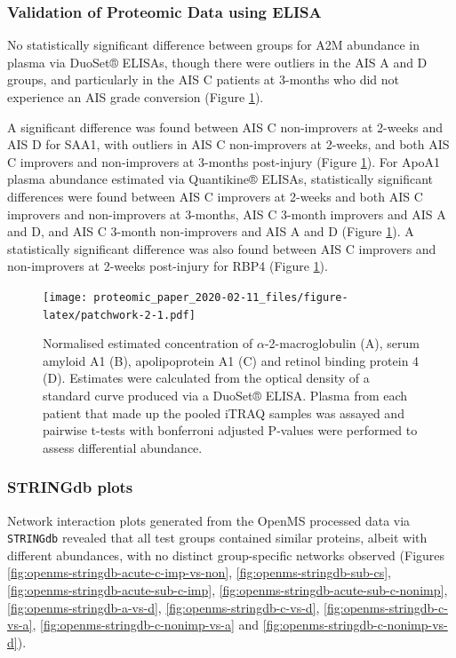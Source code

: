 \documentclass[9pt,lineno]{elife}
\begin{document}
\hypertarget{validation-of-proteomic-data-using-elisa}{%
\subsubsection{Validation of Proteomic Data using ELISA}\label{validation-of-proteomic-data-using-elisa}}

No statistically significant difference between groups for A2M abundance in plasma via DuoSet® ELISAs, though there were outliers in the AIS A and D groups, and particularly in the AIS C patients at 3-months who did not experience an AIS grade conversion (Figure \ref{fig:patchwork-2}).

A significant difference was found between AIS C non-improvers at 2-weeks and AIS D for SAA1, with outliers in AIS C non-improvers at 2-weeks, and both AIS C improvers and non-improvers at 3-months post-injury (Figure \ref{fig:patchwork-2}).
For ApoA1 plasma abundance estimated via Quantikine® ELISAs, statistically significant differences were found between AIS C improvers at 2-weeks and both AIS C improvers and non-improvers at 3-months, AIS C 3-month improvers and AIS A and D, and AIS C 3-month non-improvers and AIS A and D (Figure \ref{fig:patchwork-2}).
A statistically significant difference was also found between AIS C improvers and non-improvers at 2-weeks post-injury for RBP4 (Figure \ref{fig:patchwork-2}).



\begin{figure}
\centering
\texttt{[image: proteomic\_paper\_2020-02-11\_files/figure-latex/patchwork-2-1.pdf]}
\caption{\label{fig:patchwork-2}Normalised estimated concentration of \(\alpha\)-2-macroglobulin (A), serum amyloid A1 (B), apolipoprotein A1 (C) and retinol binding protein 4 (D). Estimates were calculated from the optical density of a standard curve produced via a DuoSet® ELISA. Plasma from each patient that made up the pooled iTRAQ samples was assayed and pairwise t-tests with bonferroni adjusted P-values were performed to assess differential abundance.}
\end{figure}

\hypertarget{stringdb-plots}{%
\subsubsection{STRINGdb plots}\label{stringdb-plots}}

Network interaction plots generated from the OpenMS processed data via \texttt{STRINGdb} revealed that all test groups contained similar proteins, albeit with different abundances, with no distinct group-specific networks observed (Figures \ref{fig:openms-stringdb-acute-c-imp-vs-non}, \ref{fig:openms-stringdb-sub-cs}, \ref{fig:openms-stringdb-acute-sub-c-imp}, \ref{fig:openms-stringdb-acute-sub-c-nonimp}, \ref{fig:openms-stringdb-a-vs-d}, \ref{fig:openms-stringdb-c-vs-d}, \ref{fig:openms-stringdb-c-vs-a}, \ref{fig:openms-stringdb-c-nonimp-vs-a} and \ref{fig:openms-stringdb-c-nonimp-vs-d}).
\end{document}
